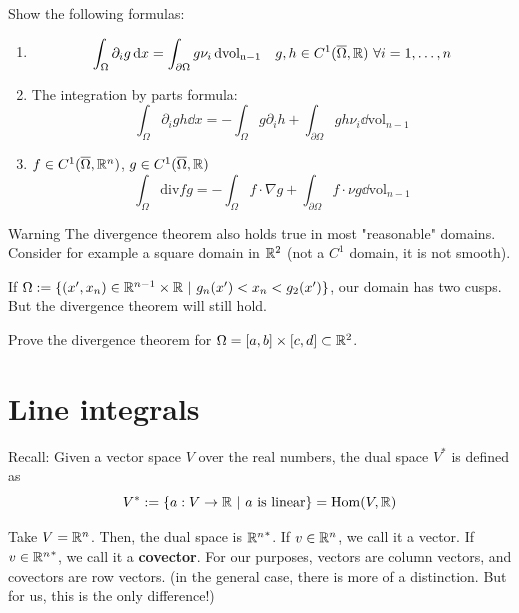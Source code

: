 \documentclass[12pt]{article}
\begin{document}
\begin{exercise}{}{}
    Show the following formulas:
    \begin{enumerate}[label=\alph*)]
        \item
        $$
            \int_\Omega \partial_i g \mathop{}\!\mathrm{d} x = \int_{\partial\Omega} g \nu_i \mathop{}\!\mathrm{d} \mathrm{vol_{n-1}} \quad g, h \in C^1(\overline\Omega, \mathbb{R}) \ \forall i = 1,\dots,n
        $$

        \item The integration by parts formula:
        $$
            \int_\Omega \partial_i g h \dd x = - \int_\Omega g \partial_i h + \int_{\partial \Omega} g h \nu_i \dd \mathrm{vol}_{n-1}
        $$

        \item $f \in C^1(\overline\Omega, \mathbb{R}^n)$, $g \in C^1(\overline\Omega, \mathbb{R})$
        $$
            \int_\Omega \mathrm{div} f g = - \int_\Omega f \cdot \nabla g + \int_{\partial \Omega} f \cdot \nu g \dd \mathrm{vol}_{n-1}
        $$
    \end{enumerate}
\end{exercise}

\begin{notebox}{Warning}{}
    The divergence theorem also holds true in most "reasonable" domains. Consider for example a square domain in $\mathbb{R}^2$ (not a $C^1$ domain, it is not smooth).

    If $\Omega := \{ (x', x_n) \in \mathbb{R}^{n-1} \times \mathbb{R} \ |\ g_n(x') < x_n < g_2(x')\}$, our domain has two cusps. But the divergence theorem will still hold.
\end{notebox}

\begin{exercise}{}{}
    Prove the divergence theorem for $\Omega = [a, b] \times [c, d] \subset \mathbb{R}^2$.
\end{exercise}

\section{Line integrals}

Recall: Given a vector space $V$ over the real numbers, the dual space $V^*$ is defined as
$$
    V^* := \{ a: V \rightarrow \mathbb{R} \ |\ a \text{ is linear} \} = \mathrm{Hom}(V, \mathbb{R})
$$

Take $V = \mathbb{R}^n$. Then, the dual space is ${\mathbb{R}^n}^*$. If $v \in \mathbb{R}^n$, we call it a vector. If $v \in {\mathbb{R}^n}^*$, we call it a \textbf{covector}. For our purposes, vectors are column vectors, and covectors are row vectors. (in the general case, there is more of a distinction. But for us, this is the only difference!)
\end{document}
